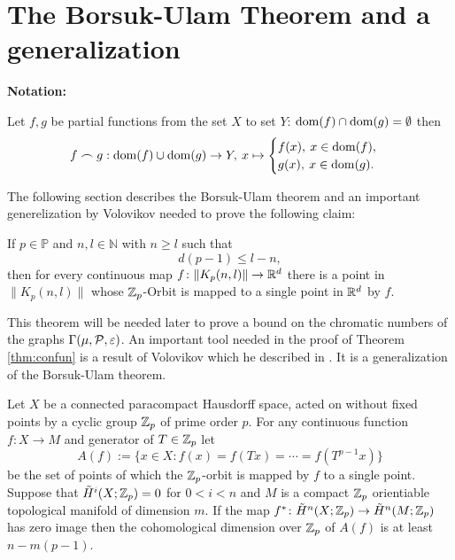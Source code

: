\section{The Borsuk-Ulam Theorem and a generalization}

\textbf{Notation:}

Let $f, g$ be partial functions from the set $X$ to set $Y$: $\dom(f) \cap \dom(g) = \emptyset$ then
\begin{equation*}
  f \frown g: \dom(f) \cup \dom(g) \to Y, \: x \mapsto \begin{cases}
    f(x), \: x \in \dom(f), \\
    g(x), \: x \in \dom(g).
  \end{cases}
\end{equation*}

The following section describes the Borsuk-Ulam theorem and an important generelization by Volovikov needed to prove the following claim:
\begin{thm}\label{thm:confun}
  If $p \in \mathbb{P}$ and $n, l \in \mathbb{N}$ with $n \geq l$ such that
  \begin{equation*}
    d(p-1) \leq l - n,
  \end{equation*}
  then for every continuous map $f\colon\lVert K_p(n,l)\rVert \to \R^d$ there is a point in $\lVert K_p(n,l)\rVert$ whose $\Z_p$-Orbit is mapped to a single point in $\R^d$ by $f$.
\end{thm}
This theorem will be needed later to prove a bound on the chromatic numbers of the graphs $\Gamma(\mu, \P, \varepsilon)$.
An important tool needed in the proof of Theorem \ref{thm:confun} is a result of Volovikov which he described in \cite{vol1980}. It is a generalization of the Borsuk-Ulam theorem.
\begin{lemma}\label{lem:vol}
  Let $X$ be a connected paracompact Hausdorff space, acted on without fixed points by a cyclic group $\Z_p$ of prime order $p$. For any continuous function $f\colon X \to M$ and generator of $T \in \Z_p$ let
  \begin{equation*}
    A(f) := \{x\in X\colon f(x) = f(Tx) = \cdots = f(T^{p-1}x)\}
  \end{equation*}
  be the set of points of which the $\Z_p$-orbit is mapped by $f$ to a single point. Suppose that $\tilde{H}^i(X; \Z_p) = 0$ for $0 < i < n$ and $M$ is a compact $\Z_p$ orientiable topological manifold of dimension $m$. If the map $f^*\colon \tilde{H}^n(X; \Z_p) \to \tilde{H}^n(M; \Z_p)$ has zero image then the cohomological dimension over $\Z_p$ of $A(f)$ is at least $n-m(p-1)$. 
\end{lemma}

